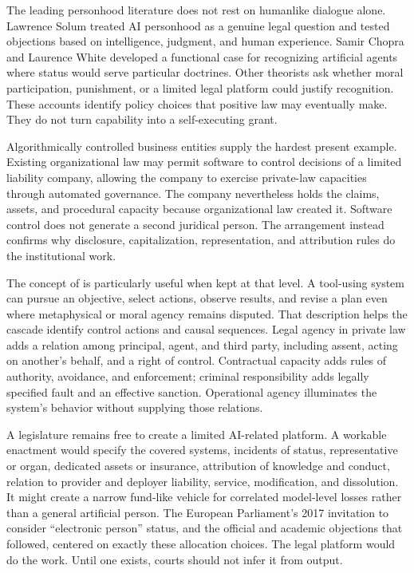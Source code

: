The leading personhood literature does not rest on humanlike dialogue alone. Lawrence Solum treated AI personhood as a genuine legal question and tested objections based on intelligence, judgment, and human experience. Samir Chopra and Laurence White developed a functional case for recognizing artificial agents where status would serve particular doctrines. Other theorists ask whether moral participation, punishment, or a limited legal platform could justify recognition. These accounts identify policy choices that positive law may eventually make. They do not turn capability into a self-executing grant.

Algorithmically controlled business entities supply the hardest present example. Existing organizational law may permit software to control decisions of a limited liability company, allowing the company to exercise private-law capacities through automated governance. The company nevertheless holds the claims, assets, and procedural capacity because organizational law created it. Software control does not generate a second juridical person. The arrangement instead confirms why disclosure, capitalization, representation, and attribution rules do the institutional work.

The concept of  is particularly useful when kept at that level. A tool-using system can pursue an objective, select actions, observe results, and revise a plan even where metaphysical or moral agency remains disputed. That description helps the cascade identify control actions and causal sequences. Legal agency in private law adds a relation among principal, agent, and third party, including assent, acting on another's behalf, and a right of control. Contractual capacity adds rules of authority, avoidance, and enforcement; criminal responsibility adds legally specified fault and an effective sanction. Operational agency illuminates the system's behavior without supplying those relations.

A legislature remains free to create a limited AI-related platform. A workable enactment would specify the covered systems, incidents of status, representative or organ, dedicated assets or insurance, attribution of knowledge and conduct, relation to provider and deployer liability, service, modification, and dissolution. It might create a narrow fund-like vehicle for correlated model-level losses rather than a general artificial person. The European Parliament's 2017 invitation to consider ``electronic person'' status, and the official and academic objections that followed, centered on exactly these allocation choices. The legal platform would do the work. Until one exists, courts should not infer it from output.

